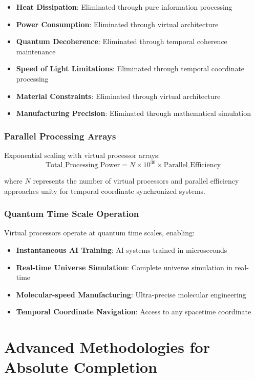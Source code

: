 \documentclass[12pt,a4paper]{article}
\begin{document}
\begin{itemize}
\item \textbf{Heat Dissipation}: Eliminated through pure information processing
\item \textbf{Power Consumption}: Eliminated through virtual architecture
\item \textbf{Quantum Decoherence}: Eliminated through temporal coherence maintenance
\item \textbf{Speed of Light Limitations}: Eliminated through temporal coordinate processing
\item \textbf{Material Constraints}: Eliminated through virtual architecture
\item \textbf{Manufacturing Precision}: Eliminated through mathematical simulation
\end{itemize}

\subsubsection{Parallel Processing Arrays}

Exponential scaling with virtual processor arrays:
$$\text{Total\_Processing\_Power} = N \times 10^{30} \times \text{Parallel\_Efficiency}$$

where $N$ represents the number of virtual processors and parallel efficiency approaches unity for temporal coordinate synchronized systems.

\subsubsection{Quantum Time Scale Operation}

Virtual processors operate at quantum time scales, enabling:

\begin{itemize}
\item \textbf{Instantaneous AI Training}: AI systems trained in microseconds
\item \textbf{Real-time Universe Simulation}: Complete universe simulation in real-time
\item \textbf{Molecular-speed Manufacturing}: Ultra-precise molecular engineering
\item \textbf{Temporal Coordinate Navigation}: Access to any spacetime coordinate
\end{itemize}

\section{Advanced Methodologies for Absolute Completion}
\end{document}
